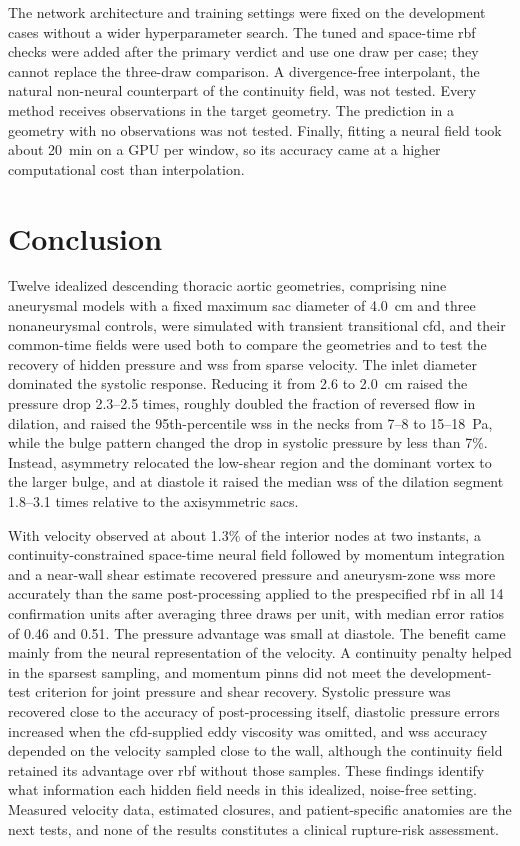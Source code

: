 \documentclass[12pt,a4paper]{article}
\newcommand{\CFD}{\ac{cfd}\xspace}
\newcommand{\PINNs}{\acp{pinn}\xspace}
\newcommand{\WSS}{\ac{wss}\xspace}
\newcommand{\RBF}{\ac{rbf}\xspace}
\theoremstyle{definition}
\numberwithin{equation}{section}
\begin{document}
The network architecture and training settings were fixed on the development cases without a wider hyperparameter search. The tuned and space-time \RBF checks were added after the primary verdict and use one draw per case; they cannot replace the three-draw comparison. A divergence-free interpolant, the natural non-neural counterpart of the continuity field, was not tested. Every method receives observations in the target geometry. The prediction in a geometry with no observations was not tested. Finally, fitting a neural field took about 20~min on a GPU per window, so its accuracy came at a higher computational cost than interpolation.

\section{Conclusion}
\label{sec:conclusion}
Twelve idealized descending thoracic aortic geometries, comprising nine aneurysmal models with a fixed maximum sac diameter of 4.0~cm and three nonaneurysmal controls, were simulated with transient transitional \CFD, and their common-time fields were used both to compare the geometries and to test the recovery of hidden pressure and \WSS from sparse velocity. The inlet diameter dominated the systolic response. Reducing it from 2.6 to 2.0~cm raised the pressure drop 2.3--2.5 times, roughly doubled the fraction of reversed flow in dilation, and raised the 95th-percentile \WSS in the necks from 7--8 to 15--18~Pa, while the bulge pattern changed the drop in systolic pressure by less than 7\%. Instead, asymmetry relocated the low-shear region and the dominant vortex to the larger bulge, and at diastole it raised the median \WSS of the dilation segment 1.8--3.1 times relative to the axisymmetric sacs.

With velocity observed at about 1.3\% of the interior nodes at two instants, a continuity-constrained space-time neural field followed by momentum integration and a near-wall shear estimate recovered pressure and aneurysm-zone \WSS more accurately than the same post-processing applied to the prespecified \RBF in all 14 confirmation units after averaging three draws per unit, with median error ratios of 0.46 and 0.51. The pressure advantage was small at diastole. The benefit came mainly from the neural representation of the velocity. A continuity penalty helped in the sparsest sampling, and momentum \PINNs did not meet the development-test criterion for joint pressure and shear recovery. Systolic pressure was recovered close to the accuracy of post-processing itself, diastolic pressure errors increased when the \CFD-supplied eddy viscosity was omitted, and \WSS accuracy depended on the velocity sampled close to the wall, although the continuity field retained its advantage over \RBF without those samples. These findings identify what information each hidden field needs in this idealized, noise-free setting. Measured velocity data, estimated closures, and patient-specific anatomies are the next tests, and none of the results constitutes a clinical rupture-risk assessment.
\end{document}
